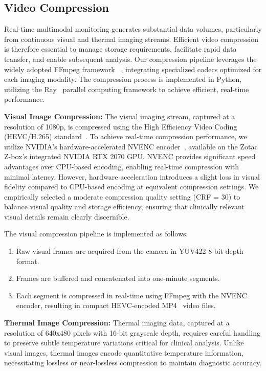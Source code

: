 \subsection{Video Compression}
\label{sec:video-compression}

Real-time multimodal monitoring generates substantial data volumes, particularly from continuous visual and thermal imaging streams. Efficient video compression is therefore essential to manage storage requirements, facilitate rapid data transfer, and enable subsequent analysis. Our compression pipeline leverages the widely adopted FFmpeg framework ~\cite{ffmpeg}, integrating specialized codecs optimized for each imaging modality. The compression process is implemented in Python, utilizing the Ray~\cite{moritz2018ray} parallel computing framework to achieve efficient, real-time performance.

\vspace{1ex}
\noindent \textbf{Visual Image Compression:} The visual imaging stream, captured at a resolution of 1080p, is compressed using the High Efficiency Video Coding (HEVC/H.265) standard~\cite{sullivan2012overview}. To achieve real-time compression performance, we utilize NVIDIA's hardware-accelerated NVENC encoder~\cite{nvenc}, available on the Zotac Z-box's integrated NVIDIA RTX 2070 GPU. NVENC provides significant speed advantages over CPU-based encoding, enabling real-time compression with minimal latency. However, hardware acceleration introduces a slight loss in visual fidelity compared to CPU-based encoding at equivalent compression settings. We empirically selected a moderate compression quality setting (CRF = 30) to balance visual quality and storage efficiency, ensuring that clinically relevant visual details remain clearly discernible.

The visual compression pipeline is implemented as follows:

\begin{enumerate}
  \item Raw visual frames are acquired from the camera in YUV422 8-bit depth format.
  \item Frames are buffered and concatenated into one-minute segments.
  \item Each segment is compressed in real-time using FFmpeg with the NVENC encoder, resulting in compact HEVC-encoded MP4~\cite{iso14496-14-2020} video files.
\end{enumerate}

\vspace{1ex}
\noindent \textbf{Thermal Image Compression:} Thermal imaging data, captured at a resolution of 640x480 pixels with 16-bit grayscale depth, requires careful handling to preserve subtle temperature variations critical for clinical analysis. Unlike visual images, thermal images encode quantitative temperature information, necessitating lossless or near-lossless compression to maintain diagnostic accuracy.

